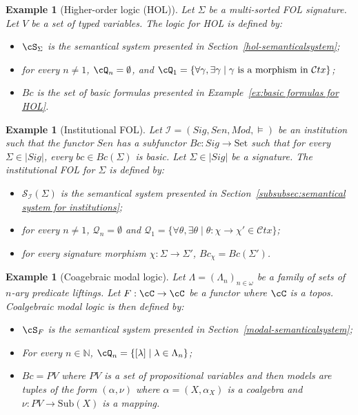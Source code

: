 \documentclass[preprint,3p,times]{elsarticle}
\newtheorem{example}[definition]{Example}
\newcommand{\Set}{\mathrm{Set}}
\newcommand{\Sub}{\mathrm{Sub}}
\newcommand{\Ctx}{\mathcal{C}tx}
\begin{document}
\begin{example}[Higher-order logic (HOL)]
Let $\Sigma$ be a multi-sorted FOL signature. Let $V$ be a set of typed variables. The logic for HOL is defined by:
\begin{itemize}
    \item $\cS_\Sigma$ is the semantical system presented in Section~\ref{hol-semanticalsystem};
    \item for every $n \neq 1$, $\cQ_n = \emptyset$, and $\cQ_1 = \{\forall \gamma,\exists \gamma \mid \gamma~\mbox{is a morphism in}~\Ctx\}$;
    \item $Bc$ is the set of basic formulas presented in Example~\ref{ex:basic formulas for HOL}.
\end{itemize}
\end{example}

\begin{example}[Institutional FOL]
\label{ex:institutional FOL}
Let $\mathcal{I} = (Sig,Sen,Mod,\models)$ be an institution such that the functor $Sen$ has a subfunctor $Bc : Sig \to \Set$ such that for every $\Sigma \in |Sig|$, every $bc \in Bc(\Sigma)$ is basic. Let $\Sigma \in |Sig|$ be a signature. The institutional FOL for \(\Sigma\) is defined by:
\begin{itemize}
    \item $\mathcal{S}_\mathcal{I}(\Sigma)$ is the semantical system presented in Section~\ref{subsubsec:semantical system for institutions};
    \item for every $n \neq 1$, $\mathcal{Q}_n = \emptyset$ and $\mathcal{Q}_1 = \{\forall \theta,\exists \theta \mid \theta : \chi \to \chi' \in \Ctx\}$;
    \item for every signature morphism $\chi : \Sigma \to \Sigma'$, $Bc_\chi = Bc(\Sigma')$.
\end{itemize}
\end{example}

\begin{example}[Coagebraic modal logic]
\label{ex:coalgebraic modal logic}
Let $\Lambda = (\Lambda_n)_{n \in \omega}$ be a family of sets of $n$-ary predicate liftings. Let $F : \cC \to \cC$ be a functor where $\cC$ is a topos. Coalgebraic modal logic is then defined by:
\begin{itemize}
    \item $\cS_F$ is the semantical system presented in Section~\ref{modal-semanticalsystem};
    \item For every $n \in \mathbb{N}$, $\cQ_n = \{[\lambda] \mid \lambda \in \Lambda_n\}$;
    \item $Bc = PV$ where $PV$ is a set of propositional variables and then models are tuples of the form $(\alpha,\nu)$ where $\alpha = (X,\alpha_X)$ is a coalgebra and $\nu : PV \to \Sub(X)$ is a mapping.
\end{itemize}
\end{example}
\end{document}
